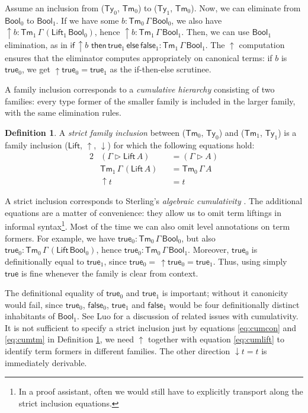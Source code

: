 \documentclass[a4paper,UKenglish,cleveref, autoref, thm-restate]{lipics-v2021}
\theoremstyle{remark}
\theoremstyle{definition}
\newtheorem{mydefinition}{Definition}
\newcommand{\Ty}{\mathsf{Ty}}
\newcommand{\Tm}{\mathsf{Tm}}
\newcommand{\ext}{\triangleright}
\newcommand{\Bool}{\mathsf{Bool}}
\newcommand{\true}{\mathsf{true}}
\newcommand{\false}{\mathsf{false}}
\newcommand{\up}{\uparrow}
\newcommand{\down}{\downarrow}
\newcommand{\Lift}{\mathsf{Lift}}
\begin{document}
Assume an inclusion from ($\Ty_0$, $\Tm_0$) to ($\Ty_1$, $\Tm_0$). Now, we can
eliminate from $\Bool_0$ to $\Bool_1$. If we have some $b :
\Tm_0\,\Gamma\,\Bool_0$, we also have $\up\!b :
\Tm_1\,\Gamma\,(\Lift_1\,\Bool_0)$, hence $\up\!b :
\Tm_1\,\Gamma\,\Bool_1$. Then, we can use $\Bool_1$ elimination, as in
$\mathsf{if}\,\up\!b\,\,\mathsf{then}\,\true_1\,\mathsf{else}\,\false_1 :
\Tm_1\,\Gamma\,\Bool_1$. The $\up$ computation ensures that the eliminator
computes appropriately on canonical terms: if $b$ is $\true_0$, we get
$\up\!\true_0 = \true_1$ as the if-then-else scrutinee.

A family inclusion corresponds to a \emph{cumulative hierarchy} consisting of
two families: every type former of the smaller family is included in the larger
family, with the same elimination rules.

\begin{mydefinition}\label{def:strict_inclusion}
A \emph{strict family inclusion} between ($\Tm_0$, $\Ty_0$) and ($\Tm_1$,
$\Ty_1$) is a family inclusion ($\Lift$, $\up$, $\down$) for which the following equations hold:
\begin{alignat}{2}
  & (\Gamma \ext \Lift\,A) &&= (\Gamma \ext A)     \label{eq:cumcon}    \\
  & \Tm_1\,\Gamma\,(\Lift\,A) &&= \Tm_0\,\Gamma\,A  \label{eq:cumtm}     \\
  & \up\!t &&= t                                    \label{eq:cumlift}
\end{alignat}
\end{mydefinition}

A strict inclusion corresponds to Sterling's \emph{algebraic cumulativity}
\cite{sterling2019algebraic}. The additional equations are a matter of convenience: they allow us
to omit term liftings in informal syntax\footnote{In a proof assistant, often we would
  still have to explicitly transport along the strict inclusion
  equations.}. Most of the time we can also omit level annotations
on term formers. For example, we have $\true_0 : \Tm_0\,\Gamma\,\Bool_0$,
but also $\true_0 : \Tm_0\,\Gamma\,(\Lift\,\Bool_0)$, hence $\true_0 :
\Tm_0\,\Gamma\,\Bool_1$. Moreover, $\true_0$ is definitionally equal to
$\true_1$, since $\true_0 =\,\up\!\true_0 = \true_1$. Thus, using simply $\true$
is fine whenever the family is clear from context.

The definitional equality of $\true_0$ and $\true_1$ is important; without it
canonicity would fail, since $\true_0$, $\false_0$, $\true_1$ and $\false_1$
would be four definitionally distinct inhabitants of $\Bool_1$. See Luo
\cite{luo2012notes} for a discussion of related issues with cumulativity. It is
not sufficient to specify a strict inclusion just by equations \ref{eq:cumcon}
and \ref{eq:cumtm} in Definition \ref{def:strict_inclusion}, we need $\up$
together with equation \ref{eq:cumlift} to identify term formers in different
families. The other direction $\down\!t = t$ is immediately derivable.
\end{document}
